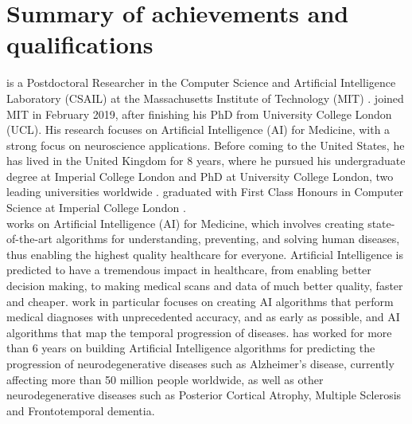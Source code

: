 \documentclass[11pt]{article}
\begin{document}
\section{Summary of \drs achievements and qualifications}

\dr is a Postdoctoral Researcher in the Computer Science and Artificial Intelligence Laboratory (CSAIL) at the Massachusetts Institute of Technology (MIT) \cite{mitoffer}. \dr joined MIT in February 2019, after finishing his PhD from University College London (UCL). His research focuses on Artificial Intelligence (AI) for Medicine, with a strong focus on neuroscience applications. Before coming to the United States, he has lived in the United Kingdom for 8 years, where he pursued his undergraduate degree at Imperial College London and PhD at University College London, two leading universities worldwide \cite{cv} \cite{degrees}. \dr graduated with First Class Honours in Computer Science at Imperial College London \cite{degrees}.\\

\dr works on Artificial Intelligence (AI) for Medicine, which involves creating state-of-the-art algorithms for understanding, preventing, and solving human diseases, thus enabling the highest quality healthcare for everyone. Artificial Intelligence is predicted to have a tremendous impact in healthcare, from enabling better decision making, to making medical scans and data of much better quality, faster and cheaper. \drs work in particular focuses on creating AI algorithms that perform medical diagnoses with unprecedented accuracy, and as early as possible, and AI algorithms that map the temporal progression of diseases. \dr has worked for more than 6 years on building Artificial Intelligence algorithms for predicting the progression of neurodegenerative diseases such as Alzheimer's disease, currently affecting more than 50 million people worldwide, as well as other neurodegenerative diseases such as Posterior Cortical Atrophy, Multiple Sclerosis and Frontotemporal dementia. \\

\end{document}
